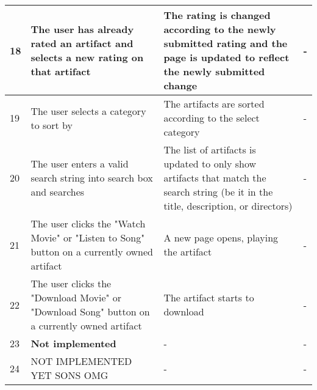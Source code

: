 {\begin{tabular}{ | p{2cm} | p{3cm} | p{4cm} | p{4cm} | }
	\hline
	18 & The user has already rated an artifact and selects a new rating on that artifact & The rating is changed according to the newly submitted rating and the page is updated to reflect the newly submitted change& - \\
	\hline
	19 & The user selects a category to sort by & The artifacts are sorted according to the select category & - \\
	\hline
	20 & The user enters a valid search string into search box and searches & The list of artifacts is updated to only show artifacts that match the search string (be it in the title, description, or directors) & - \\
	\hline
	21 & The user clicks the "Watch Movie" or "Listen to Song" button on a currently owned artifact & A new page opens, playing the artifact & - \\
	\hline
	22 & The user clicks the "Download Movie" or "Download Song" button on a currently owned artifact & The artifact starts to download & - \\
	\hline
	23 & \textbf{Not implemented}  & - & - \\
	\hline
	24 & NOT IMPLEMENTED YET SONS OMG & - & - \\
	\hline
\end{tabular}}
